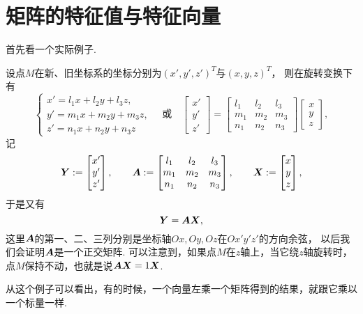 \section{矩阵的特征值与特征向量}
首先看一个实际例子.
\begin{example}
设点\(M\)在新、旧坐标系的坐标分别为\((x',y',z')^T\)与\((x,y,z)^T\)，
则在旋转变换下有\begin{equation*}
	\left\{ \begin{array}{l}
		x' = l_1 x + l_2 y + l_3 z, \\
		y' = m_1 x + m_2 y + m_3 z, \\
		z' = n_1 x + n_2 y + n_3 z
	\end{array} \right.
	\quad\text{或}\quad
	\begin{bmatrix}
		x' \\ y' \\ z'
	\end{bmatrix}
	= \begin{bmatrix}
		l_1 & l_2 & l_3 \\
		m_1 & m_2 & m_3 \\
		n_1 & n_2 & n_3
	\end{bmatrix}
	\begin{bmatrix}
		x \\ y \\ z
	\end{bmatrix},
\end{equation*}
记\begin{equation*}
	\boldsymbol{Y} := \begin{bmatrix}
		x' \\ y' \\ z'
	\end{bmatrix},
	\qquad
	\boldsymbol{A} := \begin{bmatrix}
		l_1 & l_2 & l_3 \\
		m_1 & m_2 & m_3 \\
		n_1 & n_2 & n_3
	\end{bmatrix},
	\qquad
	\boldsymbol{X} := \begin{bmatrix}
		x \\ y \\ z
	\end{bmatrix},
\end{equation*}
于是又有\begin{equation*}
	\boldsymbol{Y}=\boldsymbol{A}\boldsymbol{X},
\end{equation*}
这里\(\boldsymbol{A}\)的第一、二、三列分别是坐标轴\(Ox,Oy,Oz\)在\(Ox'y'z'\)的方向余弦，
以后我们会证明\(\boldsymbol{A}\)是一个正交矩阵.
可以注意到，如果点\(M\)在\(z\)轴上，当它绕\(z\)轴旋转时，
点\(M\)保持不动，也就是说\(\boldsymbol{A}\boldsymbol{X}=1\boldsymbol{X}\).
\end{example}
从这个例子可以看出，有的时候，一个向量左乘一个矩阵得到的结果，就跟它乘以一个标量一样.

